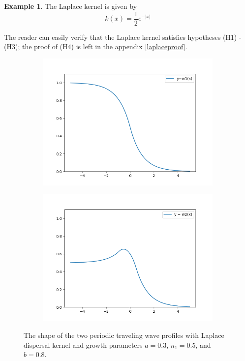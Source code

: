 \documentclass[11pt]{article}
\theoremstyle{definition}
\newtheorem{ex}[thm]{Example}
\numberwithin{equation}{section}
\numberwithin{thm}{section}
\renewcommand{\a}{a}
\renewcommand{\b}{b}
\newcommand{\m}{n_1}
\begin{document}
\begin{ex}
The Laplace kernel is given by
\begin{equation}\label{laplacekernel}
k(x) = \frac{1}{2} e^{-|x|}
\end{equation}

The reader can easily verify that the Laplace kernel satisfies hypotheses (H1) - (H3); the proof of (H4) is left in the appendix \ref{laplaceproof}.

\begin{figure}
\centering
\begin{subfigure}{.5\textwidth}
  \centering
  \includegraphics[width=.9\linewidth]{figures/fig2A.png}
  \label{fig:sub1}
\end{subfigure}%
\begin{subfigure}{.5\textwidth}
  \centering
  \includegraphics[width=.9\linewidth]{figures/fig2B.png}
  \label{fig:sub2}
\end{subfigure}
\caption{The shape of the two periodic traveling wave profiles with Laplace dispersal kernel and growth parameters $\a=0.3$, $\m=0.5$, and $\b=0.8$.}
\label{fig:test}
\end{figure}



\end{ex}
\end{document}
